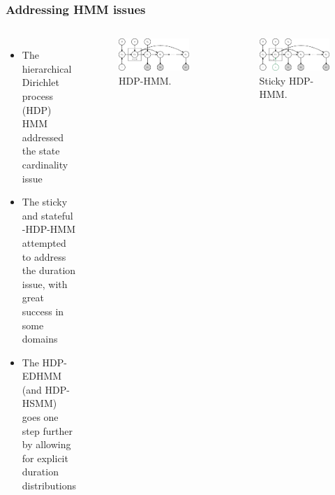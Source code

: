 \documentclass[aspectratio=169]{beamer}
\begin{document}
\begin{frame}
    \frametitle{Addressing HMM issues}

    \begin{columns}[c] 


        \begin{itemize}
            \item The hierarchical Dirichlet process (HDP) HMM addressed the state cardinality issue
            \item The sticky and stateful -HDP-HMM attempted to address the duration issue, with great success in some domains
            \item The HDP-EDHMM (and HDP-HSMM) goes one step further by allowing for explicit duration distributions
        \end{itemize}


        \begin{figure}
            \includegraphics[width=1.0\linewidth]{hdphmm.eps}
            \caption{HDP-HMM.}
        \end{figure}
        \vspace{-1cm}
        \begin{figure}
            \includegraphics[width=1.0\linewidth]{sticky-hdphmm.eps}
            \caption{Sticky HDP-HMM.}
        \end{figure}

    \end{columns}

\end{frame}
\end{document}

